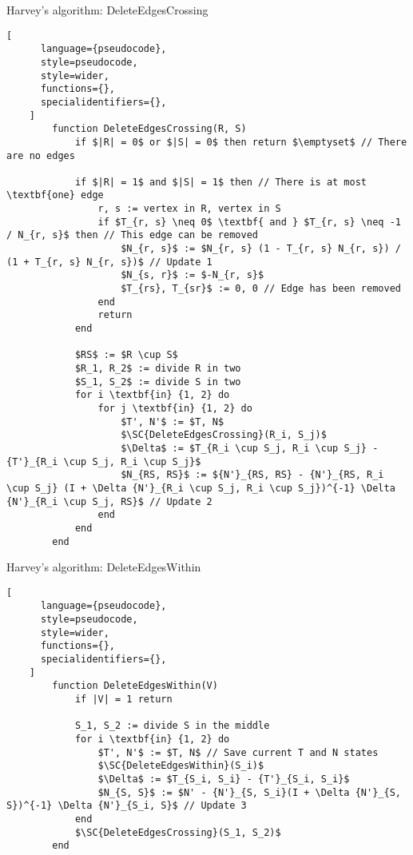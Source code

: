 \begin{programruledcaption}{Harvey's algorithm: DeleteEdgesCrossing}
    \begin{lstlisting}[
      language={pseudocode},
      style=pseudocode,
      style=wider,
      functions={},
      specialidentifiers={},
    ]
        function DeleteEdgesCrossing(R, S)
            if $|R| = 0$ or $|S| = 0$ then return $\emptyset$ // There are no edges

            if $|R| = 1$ and $|S| = 1$ then // There is at most \textbf{one} edge
                r, s := vertex in R, vertex in S
                if $T_{r, s} \neq 0$ \textbf{ and } $T_{r, s} \neq -1 / N_{r, s}$ then // This edge can be removed
                    $N_{r, s}$ := $N_{r, s} (1 - T_{r, s} N_{r, s}) / (1 + T_{r, s} N_{r, s})$ // Update 1
                    $N_{s, r}$ := $-N_{r, s}$
                    $T_{rs}, T_{sr}$ := 0, 0 // Edge has been removed
                end
                return
            end

            $RS$ := $R \cup S$
            $R_1, R_2$ := divide R in two 
            $S_1, S_2$ := divide S in two
            for i \textbf{in} {1, 2} do
                for j \textbf{in} {1, 2} do
                    $T', N'$ := $T, N$
                    $\SC{DeleteEdgesCrossing}(R_i, S_j)$
                    $\Delta$ := $T_{R_i \cup S_j, R_i \cup S_j} - {T'}_{R_i \cup S_j, R_i \cup S_j}$
                    $N_{RS, RS}$ := ${N'}_{RS, RS} - {N'}_{RS, R_i \cup S_j} (I + \Delta {N'}_{R_i \cup S_j, R_i \cup S_j})^{-1} \Delta {N'}_{R_i \cup S_j, RS}$ // Update 2
                end
            end
        end
    \end{lstlisting}
\end{programruledcaption}

\begin{programruledcaption}{Harvey's algorithm: DeleteEdgesWithin}
    \begin{lstlisting}[
      language={pseudocode},
      style=pseudocode,
      style=wider,
      functions={},
      specialidentifiers={},
    ]
        function DeleteEdgesWithin(V)
            if |V| = 1 return

            S_1, S_2 := divide S in the middle
            for i \textbf{in} {1, 2} do
                $T', N'$ := $T, N$ // Save current T and N states
                $\SC{DeleteEdgesWithin}(S_i)$
                $\Delta$ := $T_{S_i, S_i} - {T'}_{S_i, S_i}$
                $N_{S, S}$ := $N' - {N'}_{S, S_i}(I + \Delta {N'}_{S, S})^{-1} \Delta {N'}_{S_i, S}$ // Update 3
            end
            $\SC{DeleteEdgesCrossing}(S_1, S_2)$
        end
    \end{lstlisting}
\end{programruledcaption}


